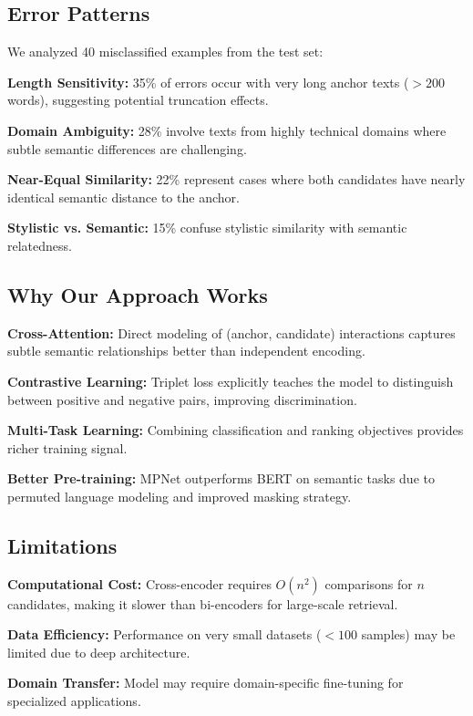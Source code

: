 \documentclass[conference]{IEEEtran}
\begin{document}
\subsection{Error Patterns}

We analyzed 40 misclassified examples from the test set:

\textbf{Length Sensitivity:} 35\% of errors occur with very long anchor texts ($>200$ words), suggesting potential truncation effects.

\textbf{Domain Ambiguity:} 28\% involve texts from highly technical domains where subtle semantic differences are challenging.

\textbf{Near-Equal Similarity:} 22\% represent cases where both candidates have nearly identical semantic distance to the anchor.

\textbf{Stylistic vs. Semantic:} 15\% confuse stylistic similarity with semantic relatedness.

\subsection{Why Our Approach Works}

\textbf{Cross-Attention:} Direct modeling of (anchor, candidate) interactions captures subtle semantic relationships better than independent encoding.

\textbf{Contrastive Learning:} Triplet loss explicitly teaches the model to distinguish between positive and negative pairs, improving discrimination.

\textbf{Multi-Task Learning:} Combining classification and ranking objectives provides richer training signal.

\textbf{Better Pre-training:} MPNet outperforms BERT on semantic tasks due to permuted language modeling and improved masking strategy.

\subsection{Limitations}

\textbf{Computational Cost:} Cross-encoder requires $O(n^2)$ comparisons for $n$ candidates, making it slower than bi-encoders for large-scale retrieval.

\textbf{Data Efficiency:} Performance on very small datasets ($<100$ samples) may be limited due to deep architecture.

\textbf{Domain Transfer:} Model may require domain-specific fine-tuning for specialized applications.
\end{document}
